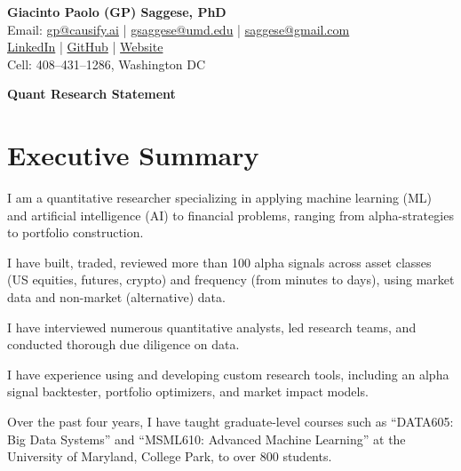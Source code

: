 \documentclass[11pt, letterpaper]{article}
\begin{document}
  \begin{center}
    {\LARGE \textbf{Giacinto Paolo (GP) Saggese, PhD}} \\[6pt]

    {\large Email: \href{mailto:gp@causify.ai}{gp@causify.ai} \;|\; \href{mailto:gsaggese@umd.edu}{gsaggese@umd.edu} \;|\; \href{mailto:saggese@gmail.com}{saggese@gmail.com} }\\[6pt]

    {\large \href{https://www.linkedin.com/in/gpsaggese/}{LinkedIn} \;|\; \href{https://github.com/gpsaggese}{GitHub} \;|\; \href{https://gpsaggese.github.io/umd_classes/}{Website} }\\[6pt]

    {\large Cell: 408--431--1286, Washington DC }
  \end{center}

  \vspace{12pt}

  \begin{center}
    {\LARGE \textbf{Quant Research Statement}}
  \end{center}

  \vspace{12pt}

  \tableofcontents
  \newpage

  \section{Executive Summary}
  \label{executive-summary}

  I am a quantitative researcher specializing in applying machine
  learning (ML) and artificial intelligence (AI) to financial problems, ranging
  from alpha-strategies to portfolio construction.

  I have built, traded, reviewed more than 100 alpha signals across
  asset classes (US equities, futures, crypto) and frequency (from minutes
  to days), using market data and non-market (alternative) data.

  I have interviewed numerous quantitative analysts, led research teams,
  and conducted thorough due diligence on data.

  I have experience using and developing custom research tools,
  including an alpha signal backtester, portfolio optimizers, and market
  impact models.

  Over the past four years, I have taught graduate-level courses such as
  ``DATA605: Big Data Systems'' and ``MSML610: Advanced Machine Learning''
  at the University of Maryland, College Park, to over 800 students.
\end{document}
